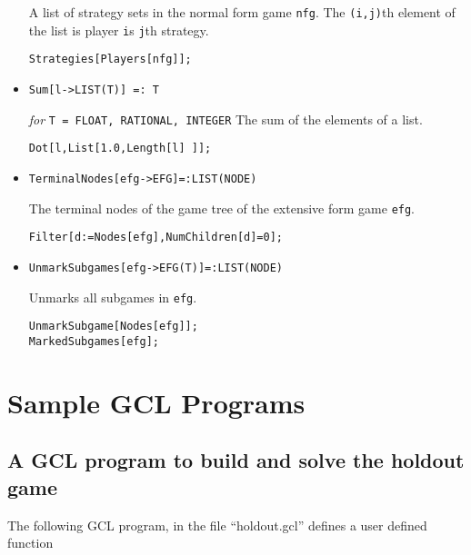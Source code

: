 \begin{itemize}
\bd 
A list of strategy sets in the normal form game \verb+nfg+. The
\verb+(i,j)+th element of the list is player \verb+i+s \verb+j+th
strategy.  
\begin{verbatim}
Strategies[Players[nfg]];
\end{verbatim} 
\ed

\item{}
\protect \large \begin{verbatim}
Sum[l->LIST(T)] =: T
\end{verbatim}\normalsize

{\it for} {\tt T = FLOAT, RATIONAL, INTEGER}
\bd 
The sum of the elements of a list.  
\begin{verbatim}
Dot[l,List[1.0,Length[l] ]];
\end{verbatim} 
\ed

\item{}
\protect \large \begin{verbatim}
TerminalNodes[efg->EFG]=:LIST(NODE)
\end{verbatim}\normalsize

\bd 
The terminal nodes of the game tree of the extensive form game \verb+efg+.
\begin{verbatim}
Filter[d:=Nodes[efg],NumChildren[d]=0];
\end{verbatim} 
\ed

\item{}
\protect \large \begin{verbatim}
UnmarkSubgames[efg->EFG(T)]=:LIST(NODE)
\end{verbatim}\normalsize

\bd 
Unmarks all subgames in \verb+efg+.
\begin{verbatim}
UnmarkSubgame[Nodes[efg]];
MarkedSubgames[efg];
\end{verbatim} 
\ed

\end{itemize}

\appendix
\chapter{Sample GCL Programs}
\pagestyle{headings}

\section{A GCL program to build and solve the holdout game}

The following GCL program, in the file ``holdout.gcl'' defines a user
defined function

